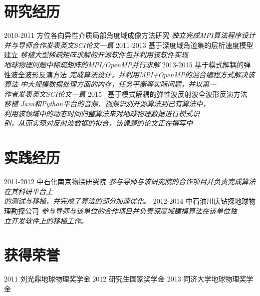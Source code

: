 \documentclass[]{friggeri-cv}
\begin{document}
\section{研究经历}

\begin{entrylist}
  \entry
    {2010-2011}
    {方位各向异性介质局部角度域成像方法研究}
	{\emph{独立完成MPI算法程序设计并与导师合作发表英文SCI论文一篇}}
  \entry
    {2011-2013}
    {基于深度域角道集的层析速度模型建立}
    {\emph{移植大型稀疏矩阵求解的开源软件包并利用该软件实现\\
	地球物理问题中稀疏矩阵的MPI/OpenMP并行求解}}
  \entry
    {2013-2015}
    {基于模式解耦的弹性波全波形反演方法}
    {\emph{
		完成算法设计，并利用MPI+OpenMP的混合编程方式解决该算法
		中大规模数据处理方面的内存，任务平衡等实际问题，并以第一\\
		作者发表英文SCI论文一篇
	}}
  \entry
    {2015--}
    {基于模式解耦的弹性波反射波全波形反演方法}
	{\emph{
		移植 Java和Python平台的音频、视频识别开源算法到已有算法中，\\
		利用该领域中的动态时间归整算法来对地球物理数据进行模式识\\
		别，从而实现对反射波数据的拟合，该课题的论文正在撰写中
	}}
\end{entrylist}

\section{实践经历}
\begin{entrylist}
  \entry
    {2011-2012}
    {中石化南京物探研究院}
	{\emph{
		参与导师与该研究院的合作项目并负责完成算法在其科研平台上\\
		的测试与移植，并完成了算法的部分加速优化。
	}}
  \entry
    {2012-2014}
    {中石油川庆钻探地球物理勘探公司}
	{\emph{
		参与导师与该单位的合作项目并负责深度域建模算法在该单位独\\
		立开发软件上的移植工作。
	}}
\end{entrylist}
\section{获得荣誉}
\begin{entrylist}
  \entryTwo
    {2011}
    {刘光鼎地球物理奖学金}
  \entryTwo
    {2012}
	{研究生国家奖学金}
  \entryTwo
    {2013}
    {同济大学地球物理奖学金}
\par\vspace{\parskip}
\end{entrylist}
\end{document}
